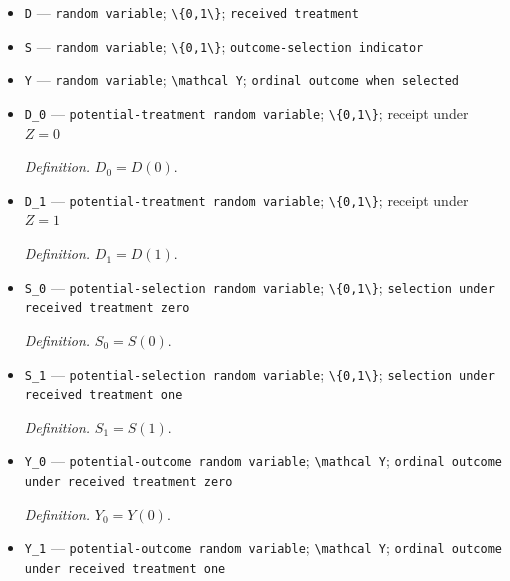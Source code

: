 \documentclass{article}
\begin{document}
\begin{itemize}
  \item \texttt{D} --- \texttt{random variable}; \texttt{\textbackslash{}\allowbreak{}\{0,\allowbreak{}1\textbackslash{}\allowbreak{}\}\allowbreak{}}; \texttt{received treatment}
  \item \texttt{S} --- \texttt{random variable}; \texttt{\textbackslash{}\allowbreak{}\{0,\allowbreak{}1\textbackslash{}\allowbreak{}\}\allowbreak{}}; \texttt{outcome-\allowbreak{}selection indicator}
  \item \texttt{Y} --- \texttt{random variable}; \texttt{\textbackslash{}\allowbreak{}mathcal Y}; \texttt{ordinal outcome when selected}
  \item \texttt{D\_\allowbreak{}0} --- \texttt{potential-\allowbreak{}treatment random variable}; \texttt{\textbackslash{}\allowbreak{}\{0,\allowbreak{}1\textbackslash{}\allowbreak{}\}\allowbreak{}}; receipt under \(Z=0\)
  \par\smallskip\noindent\emph{Definition.} \(D_0=D(0)\).
  \item \texttt{D\_\allowbreak{}1} --- \texttt{potential-\allowbreak{}treatment random variable}; \texttt{\textbackslash{}\allowbreak{}\{0,\allowbreak{}1\textbackslash{}\allowbreak{}\}\allowbreak{}}; receipt under \(Z=1\)
  \par\smallskip\noindent\emph{Definition.} \(D_1=D(1)\).
  \item \texttt{S\_\allowbreak{}0} --- \texttt{potential-\allowbreak{}selection random variable}; \texttt{\textbackslash{}\allowbreak{}\{0,\allowbreak{}1\textbackslash{}\allowbreak{}\}\allowbreak{}}; \texttt{selection under received treatment zero}
  \par\smallskip\noindent\emph{Definition.} \(S_0=S(0)\).
  \item \texttt{S\_\allowbreak{}1} --- \texttt{potential-\allowbreak{}selection random variable}; \texttt{\textbackslash{}\allowbreak{}\{0,\allowbreak{}1\textbackslash{}\allowbreak{}\}\allowbreak{}}; \texttt{selection under received treatment one}
  \par\smallskip\noindent\emph{Definition.} \(S_1=S(1)\).
  \item \texttt{Y\_\allowbreak{}0} --- \texttt{potential-\allowbreak{}outcome random variable}; \texttt{\textbackslash{}\allowbreak{}mathcal Y}; \texttt{ordinal outcome under received treatment zero}
  \par\smallskip\noindent\emph{Definition.} \(Y_0=Y(0)\).
  \item \texttt{Y\_\allowbreak{}1} --- \texttt{potential-\allowbreak{}outcome random variable}; \texttt{\textbackslash{}\allowbreak{}mathcal Y}; \texttt{ordinal outcome under received treatment one}

\end{itemize}
\end{document}
